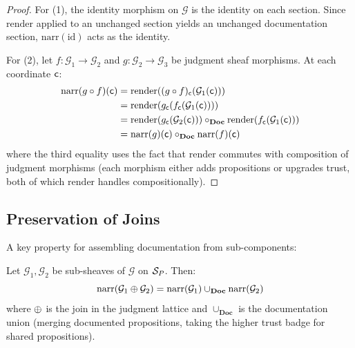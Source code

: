 \documentclass[11pt]{article}
\newcommand{\NarrFunc}{\mathrm{narr}}
\newcommand{\RenderFunc}{\mathrm{render}}
\newcommand{\DocCat}{\mathbf{Doc}}                    %
\begin{document}
\begin{proof}
For (1), the identity morphism on $\mathcal{G}$ is the identity on
each section.  Since $\RenderFunc$ applied to an unchanged section
yields an unchanged documentation section, $\NarrFunc(\mathrm{id})$
acts as the identity.

For (2), let $f \colon \mathcal{G}_1 \to \mathcal{G}_2$ and
$g \colon \mathcal{G}_2 \to \mathcal{G}_3$ be judgment sheaf morphisms.
At each coordinate $\mathsf{c}$:
\begin{align*}
\NarrFunc(g \circ f)(\coord)
  &= \RenderFunc((g \circ f)_{\coord}(\mathcal{G}_1(\coord))) \\
  &= \RenderFunc(g_{\coord}(f_{\coord}(\mathcal{G}_1(\coord)))) \\
  &= \RenderFunc(g_{\coord}(\mathcal{G}_2(\coord)))
     \circ_{\DocCat} \RenderFunc(f_{\coord}(\mathcal{G}_1(\coord))) \\
  &= \NarrFunc(g)(\coord) \circ_{\DocCat} \NarrFunc(f)(\coord)
\end{align*}
where the third equality uses the fact that $\RenderFunc$ commutes with
composition of judgment morphisms (each morphism either adds propositions
or upgrades trust, both of which $\RenderFunc$ handles compositionally).
\end{proof}

\subsection{Preservation of Joins}

A key property for assembling documentation from sub-components:

\begin{theorem}\label{thm:narr-joins}
Let $\mathcal{G}_1, \mathcal{G}_2$ be sub-sheaves of $\mathcal{G}$ on
$\mathcal{S}_P$.  Then:
\[
  \NarrFunc(\mathcal{G}_1 \tjoin \mathcal{G}_2)
  = \NarrFunc(\mathcal{G}_1) \cup_{\DocCat} \NarrFunc(\mathcal{G}_2)
\]
where $\oplus$ is the join in the judgment lattice and
$\cup_{\DocCat}$ is the documentation union (merging documented
propositions, taking the higher trust badge for shared propositions).
\end{theorem}
\end{document}
